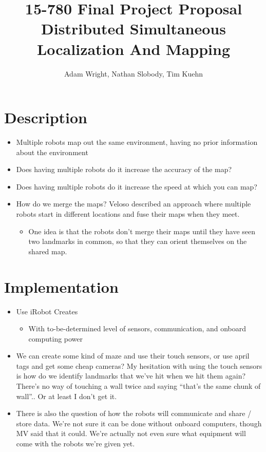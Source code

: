 \documentclass[11pt]{article}
\title{
15-780 Final Project Proposal \\ 
Distributed Simultaneous Localization And Mapping \\
}
\author{Adam Wright, Nathan Slobody, Tim Kuehn}
\begin{document}
\maketitle

\section{Description}

\begin{itemize}
    \item Multiple robots map out the same environment, having no prior information about the environment

    \item Does having multiple robots do it increase the accuracy of the map?

    \item Does having multiple robots do it increase the speed at which you can map?

    \item How do we merge the maps? Veloso described an approach where multiple robots start in different locations and fuse their maps when they meet.
        \begin{itemize}
            \item One idea is that the robots don't merge their maps until they have seen two landmarks in common, so that they can orient themselves on the shared map.
        \end{itemize}

\end{itemize}

\section{Implementation}

\begin{itemize}
    \item Use iRobot Creates
        \begin{itemize}
            \item With to-be-determined level of sensors, communication, and onboard computing power
        \end{itemize}

    \item We can create some kind of maze and use their touch sensors, or use april tags and get some cheap cameras? My hesitation with using the touch sensors is how do we identify landmarks that we've hit when we hit them again? There's no way of touching a wall twice and saying ``that's the same chunk of wall''.. Or at least I don't get it.

    \item There is also the question of how the robots will communicate and share / store data.  We're not sure it can be done without onboard computers, though MV said that it could.  We're actually not even sure what equipment will come with the robots we're given yet.  

\end{itemize}
\end{document}
